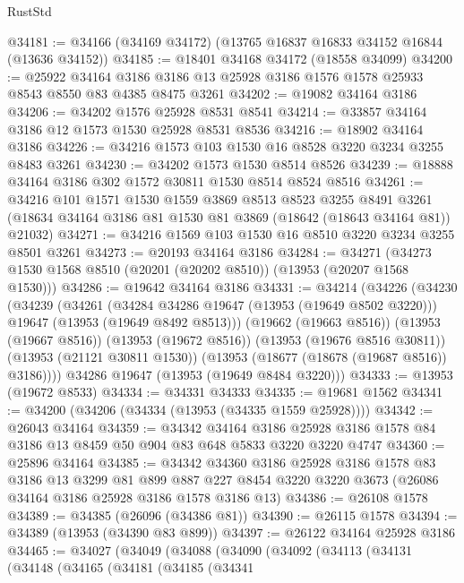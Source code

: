 \begin{lexlean}{RustStd}
\begin{coremodule}
@34181 := @34166 (@34169 @34172) (@13765 @16837 @16833 @34152 @16844 (@13636 @34152))
@34185 := @18401 @34168 @34172 (@18558 @34099)
@34200 := @25922
    @34164
    @3186
    @3186
    @13
    @25928
    @3186
    @1576
    @1578
    @25933
    @8543
    @8550
    @83
    @4385
    @8475
    @3261
@34202 := @19082 @34164 @3186
@34206 := @34202 @1576 @25928 @8531 @8541
@34214 := @33857 @34164 @3186 @12 @1573 @1530 @25928 @8531 @8536
@34216 := @18902 @34164 @3186
@34226 := @34216 @1573 @103 @1530 @16 @8528 @3220 @3234 @3255 @8483 @3261
@34230 := @34202 @1573 @1530 @8514 @8526
@34239 := @18888 @34164 @3186 @302 @1572 @30811 @1530 @8514 @8524 @8516
@34261 := @34216
    @101
    @1571
    @1530
    @1559
    @3869
    @8513
    @8523
    @3255
    @8491
    @3261
    (@18634 @34164 @3186 @81 @1530 @81 @3869 (@18642 (@18643 @34164 @81)) @21032)
@34271 := @34216 @1569 @103 @1530 @16 @8510 @3220 @3234 @3255 @8501 @3261
@34273 := @20193 @34164 @3186
@34284 := @34271 (@34273 @1530 @1568 @8510 (@20201 (@20202 @8510)) (@13953 (@20207 @1568 @1530)))
@34286 := @19642 @34164 @3186
@34331 := @34214
    (@34226
      (@34230
        (@34239
          (@34261
            (@34284 @34286 @19647 (@13953 (@19649 @8502 @3220)))
            @19647
            (@13953 (@19649 @8492 @8513)))
          (@19662 (@19663 @8516))
          (@13953 (@19667 @8516))
          (@13953 (@19672 @8516))
          (@13953 (@19676 @8516 @30811))
          (@13953 (@21121 @30811 @1530))
          (@13953 (@18677 (@18678 (@19687 @8516)) @3186))))
      @34286
      @19647
      (@13953 (@19649 @8484 @3220)))
@34333 := @13953 (@19672 @8533)
@34334 := @34331 @34333
@34335 := @19681 @1562
@34341 := @34200 (@34206 (@34334 (@13953 (@34335 @1559 @25928))))
@34342 := @26043 @34164
@34359 := @34342
    @34164
    @3186
    @25928
    @3186
    @1578
    @84
    @3186
    @13
    @8459
    @50
    @904
    @83
    @648
    @5833
    @3220
    @3220
    @4747
@34360 := @25896 @34164
@34385 := @34342
    @34360
    @3186
    @25928
    @3186
    @1578
    @83
    @3186
    @13
    @3299
    @81
    @899
    @887
    @227
    @8454
    @3220
    @3220
    @3673
    (@26086 @34164 @3186 @25928 @3186 @1578 @3186 @13)
@34386 := @26108 @1578
@34389 := @34385 (@26096 (@34386 @81))
@34390 := @26115 @1578
@34394 := @34389 (@13953 (@34390 @83 @899))
@34397 := @26122 @34164 @25928 @3186
@34465 := @34027
    (@34049
      (@34088
        (@34090
          (@34092
            (@34113
              (@34131
                (@34148
                  (@34165
                    (@34181
                      (@34185
                        (@34341

\end{coremodule}
\end{lexlean}
